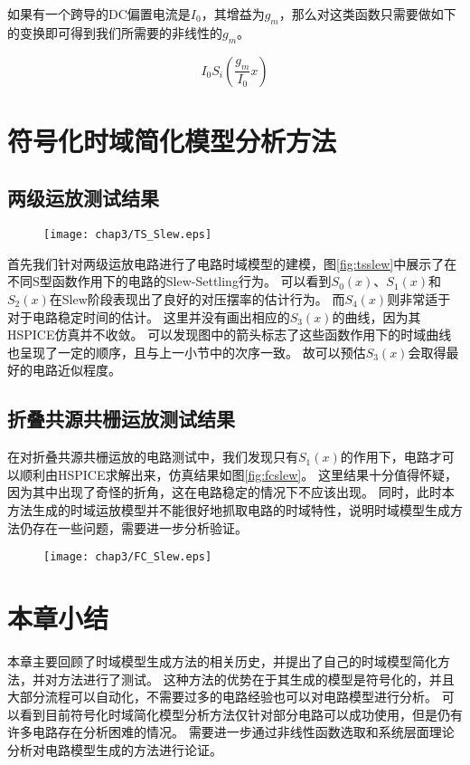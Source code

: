 如果有一个跨导的DC偏置电流是$I_0$，其增益为$g_m$，那么对这类函数只需要做如下的变换即可得到我们所需要的非线性的$g_m$。

\begin{equation}
{I_0}{S_i}\left( {\frac{{{g_m}}}{{{I_0}}}x} \right)
\end{equation}

\section{符号化时域简化模型分析方法}
\label{sec:time:test}

\subsection{两级运放测试结果}
\label{subsec:time:test:ts}

\begin{figure}[!htp]
	\centering
	\texttt{[image: chap3/TS\_Slew.eps]}
\end{figure}

首先我们针对两级运放电路进行了电路时域模型的建模，图\ref{fig:tsslew}中展示了在不同S型函数作用下的电路的Slew-Settling行为。
可以看到$S_0\left(x\right)$、$S_1\left(x\right)$和$S_2\left(x\right)$在Slew阶段表现出了良好的对压摆率的估计行为。
而$S_4\left(x\right)$则非常适于对于电路稳定时间的估计。
这里并没有画出相应的$S_3\left(x\right)$的曲线，因为其HSPICE仿真并不收敛。
可以发现图中的箭头标志了这些函数作用下的时域曲线也呈现了一定的顺序，且与上一小节中的次序一致。
故可以预估$S_3\left(x\right)$会取得最好的电路近似程度。

\subsection{折叠共源共栅运放测试结果}
\label{subsec:time:test:fc}

在对折叠共源共栅运放的电路测试中，我们发现只有$S_1\left(x\right)$的作用下，电路才可以顺利由HSPICE求解出来，仿真结果如图\ref{fig:fcslew}。
这里结果十分值得怀疑，因为其中出现了奇怪的折角，这在电路稳定的情况下不应该出现。
同时，此时本方法生成的时域运放模型并不能很好地抓取电路的时域特性，说明时域模型生成方法仍存在一些问题，需要进一步分析验证。

\begin{figure}[!htp]
	\centering
	\texttt{[image: chap3/FC\_Slew.eps]}
\end{figure}

\section{本章小结}
\label{sec:time:con}

本章主要回顾了时域模型生成方法的相关历史，并提出了自己的时域模型简化方法，并对方法进行了测试。
这种方法的优势在于其生成的模型是符号化的，并且大部分流程可以自动化，不需要过多的电路经验也可以对电路模型进行分析。
可以看到目前符号化时域简化模型分析方法仅针对部分电路可以成功使用，但是仍有许多电路存在分析困难的情况。
需要进一步通过非线性函数选取和系统层面理论分析对电路模型生成的方法进行论证。